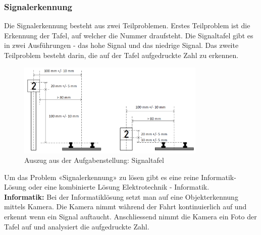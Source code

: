 \documentclass[../../main.tex]{subfiles}
\begin{document}
    \subsubsection{Signalerkennung}
    Die Signalerkennung besteht aus zwei Teilproblemen. Erstes Teilproblem ist die Erkennung der Tafel, 
    auf welcher die Nummer draufsteht. Die Signaltafel gibt es in zwei Ausführungen - das hohe Signal und das 
    niedrige Signal. Das zweite Teilproblem besteht darin, die auf der Tafel aufgedruckte Zahl zu erkennen.\\

    \begin{figure}[H]
        \includegraphics[width=0.8\textwidth]{Signal.png}
        \caption{Auszug aus der Aufgabenstellung: Signaltafel}
    \end{figure}

    Um das Problem «Signalerkennung» zu lösen gibt es eine reine Informatik- Lösung oder eine kombinierte
    Lösung Elektrotechnik - Informatik. \\

    \textbf{Informatik: }
    Bei der Informatiklösung setzt man auf eine Objekterkennung mittels Kamera. Die Kamera nimmt während der Fahrt
    kontinuierlich auf und erkennt wenn ein Signal auftaucht. Anschliessend nimmt die Kamera ein Foto der Tafel auf und
    analysiert die aufgedruckte Zahl. 
\end{document}
